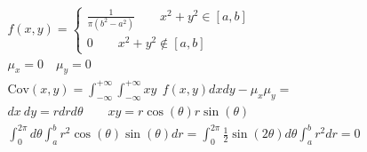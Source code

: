 \documentclass[a4paper, oneside]{article}
\begin{document}
\begin{gather*}
    f(x,y) = \begin{cases}
        \frac{1}{\pi (b^2 - a^2)} \qquad x^2+y^2 \in [a,b]\\
        0 \qquad x^2+y^2 \notin [a,b]
    \end{cases}\\
    \mu_x = 0 \quad \mu_y = 0\\
    \text{Cov}(x,y) = \int_{-\infty}^{+\infty} \int_{-\infty}^{+\infty} xy \ \ f(x,y) dx dy - \mu_x \mu_y = \\
    dx \ dy =  r dr d\theta \qquad xy = r\cos(\theta)r\sin(\theta)\\
    \int_{0}^{2 \pi} d\theta \int_{a}^{b} r^2 \cos(\theta) \sin(\theta) dr = \int_{0}^{2 \pi} \frac{1}{2} \sin(2\theta) d\theta \int_{a}^{b} r^2 dr = 0
\end{gather*}
\end{document}
